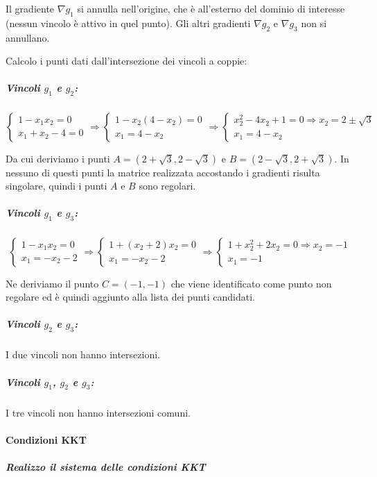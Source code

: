 \documentclass[\main/main.tex]{subfiles}
\begin{document}
Il gradiente $ \nabla g_1$ si annulla nell'origine, che è all'esterno del dominio di interesse (nessun vincolo è attivo in quel punto). Gli altri gradienti $ \nabla g_2$ e $\nabla g_3$ non si annullano.

Calcolo i punti dati dall'intersezione dei vincoli a coppie:

\subparagraph*{Vincoli $g_1$ e $g_2$:}

\[
  \begin{cases}
    1-x_1x_2 = 0 \\
    x_1 + x_2 - 4 = 0
  \end{cases}
  \Rightarrow
  \begin{cases}
    1-x_2(4 - x_2) = 0 \\
    x_1  = 4 - x_2
  \end{cases}
  \Rightarrow
  \begin{cases}
    x^2_2 - 4x_2 +1 = 0 \Rightarrow x_2 = 2 \pm \sqrt{3} \\
    x_1  = 4 - x_2
  \end{cases}
\]

Da cui deriviamo i punti $A = (2 + \sqrt{3}, 2 - \sqrt{3})$ e $B = (2 - \sqrt{3}, 2 + \sqrt{3})$. In nessuno di questi punti la matrice realizzata accostando i gradienti risulta singolare, quindi i punti $A$ e $B$ sono regolari.

\subparagraph*{Vincoli $g_1$ e $g_3$:}

\[
  \begin{cases}
    1-x_1x_2 = 0 \\
    x_1  = -x_2 - 2
  \end{cases}
  \Rightarrow
  \begin{cases}
    1+(x_2 + 2)x_2 = 0 \\
    x_1  = -x_2 - 2
  \end{cases}
  \Rightarrow
  \begin{cases}
    1+x^2_2 +2x_2 = 0 \Rightarrow x_2 = -1 \\
    x_1  = -1
  \end{cases}
\]

Ne deriviamo il punto $C = (-1, -1)$ che viene identificato come punto non regolare ed è quindi aggiunto alla lista dei punti candidati.

\subparagraph*{Vincoli $g_2$ e $g_3$:}
I due vincoli non hanno intersezioni.

\subparagraph*{Vincoli $g_1$, $g_2$ e $g_3$:}
I tre vincoli non hanno intersezioni comuni.

\paragraph*{Condizioni KKT}
\subparagraph*{Realizzo il sistema delle condizioni KKT}
\end{document}
